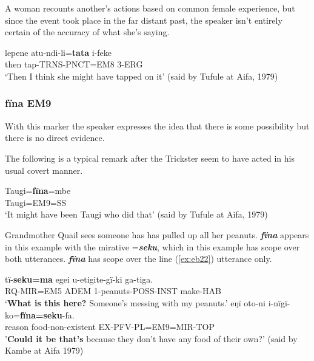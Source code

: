 \documentclass[output=paper]{langsci/langscibook}
\begin{document}
A woman recounts another's actions based on common female experience, but since the event took place in the far distant past, the speaker isn’t entirely certain of the accuracy of what she’s saying.

\begin{exe}
	\ex \label{ex:eb19}
	\gll lepene atu-ndi-li=\textbf{tata} i-feke\\
	then tap-TRNS-PNCT=EM8 3-ERG\\
	\trans ‘Then I think she might have tapped on it’ (said by Tufule at Aifa, 1979)
\end{exe}

\subsubsection{fïna EM9} 
With this marker the speaker expresses the idea that there is some possibility but there is no direct evidence. 

The following is a typical remark after the Trickster seem to have acted in his usual covert manner.

\begin{exe}
	\ex \label{ex:eb20}
	\gll Taugi=\textbf{fïna}=mbe\\
	Taugi=EM9=SS\\
	\trans ‘It might have been Taugi who did that’ (said by Tufule at Aifa, 1979)
\end{exe}

Grandmother Quail sees someone has has pulled up all her peanuts. \textbf{\textit{fïna}} appears in this example with the mirative =\textbf{\textit{seku}}, which in this example has scope over both utterances. \textbf{\textit{fïna}} has scope over the line (\ref{ex:eb22}) utterance only.

\begin{exe}
	\ex 
	\begin{xlist}
	\ex	\label{ex:eb21}
	\gll tï-\textbf{seku=ma} egei u-etigite-gï-ki ga-tiga.\\
	RQ-MIR=EM5 ADEM 1-peanuts-POSS-INST make-HAB\\
	\trans ‘\textbf{What is this here?}  Someone’s messing with my peanuts.'
	\ex \label{ex:eb22}
	\gll eŋï oto-ni i-nïgï-ko=\textbf{fïna=seku}-fa.\\ 
	reason food-non-existent EX-PFV-PL=EM9=MIR-TOP\\
	\trans '\textbf{Could it be that’s} because they don’t have any food of their own?’ (said by Kambe at Aifa 1979)
	\end{xlist}
\end{exe}
\end{document}
